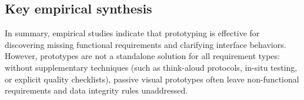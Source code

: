 \subsection{Key empirical synthesis}
In summary, empirical studies indicate that prototyping is effective for discovering missing functional requirements and clarifying interface behaviors. However, prototypes are not a standalone solution for all requirement types: without supplementary techniques (such as think-aloud protocols, in-situ testing, or explicit quality checklists), passive visual prototypes often leave non-functional requirements and data integrity rules unaddressed.
